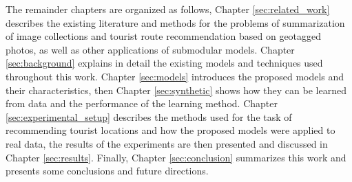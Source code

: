 The remainder chapters are organized as follows, Chapter \ref{sec:related_work} describes the existing literature and methods for the problems of summarization of image collections and tourist route recommendation based on geotagged photos, as well as other applications of submodular models. Chapter \ref{sec:background} explains in detail the existing models and techniques used throughout this work. Chapter \ref{sec:models} introduces the proposed models and their characteristics, then Chapter \ref{sec:synthetic} shows how they can be learned from data and the performance of the learning method. Chapter \ref{sec:experimental_setup} describes the methods used for the task of recommending tourist locations and how the proposed models were applied to real data, the results of the experiments are then presented and discussed in Chapter \ref{sec:results}. Finally, Chapter \ref{sec:conclusion} summarizes this work and presents some conclusions and future directions.
